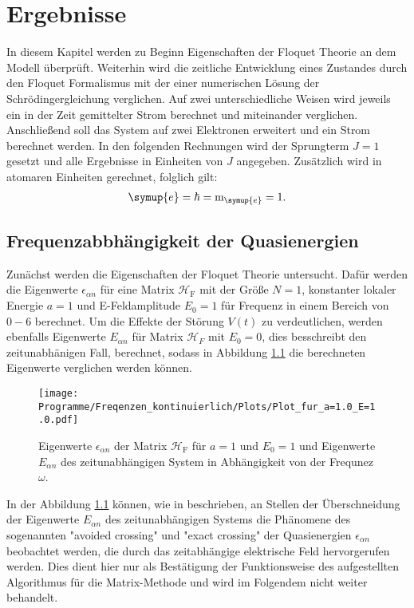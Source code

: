\chapter{Ergebnisse}
In diesem Kapitel werden zu Beginn
Eigenschaften der Floquet Theorie an dem Modell überprüft.
Weiterhin wird die zeitliche Entwicklung
eines Zustandes durch den
Floquet Formalismus mit der einer numerischen Lösung der
Schrödingergleichung verglichen.
Auf zwei unterschiedliche Weisen wird jeweils ein in der Zeit
gemittelter Strom berechnet und miteinander verglichen.
Anschließend soll das System auf zwei Elektronen erweitert und ein Strom berechnet werden.
In den folgenden Rechnungen wird der Sprungterm $J=1$
gesetzt und  alle Ergebnisse in Einheiten von $J$ angegeben.
Zusätzlich wird in atomaren Einheiten gerechnet, folglich gilt:
\begin{align}
   \symup{e}=\hbar=\text{m}_\symup{e}=1.
\end{align}
\section{Frequenzabbhängigkeit der Quasienergien}
Zunächst werden die Eigenschaften der Floquet Theorie
untersucht. Dafür
werden die Eigenwerte
 $\epsilon_{\alpha n}$ für eine
Matrix $\mathcal{H}_\mathrm{F}$ mit der
Größe $N=1$, konstanter lokaler Energie $a=1$ und E-Feldamplitude $E_0=1$
für Frequenz in einem Bereich von $0-6$  berechnet.
Um die Effekte der Störung $V(t)$ zu verdeutlichen,
werden ebenfalls Eigenwerte $E_{\alpha n}$ für Matrix $\mathcal{H}_F$ mit $E_0=0$, dies besschreibt den
zeitunabhänigen Fall, berechnet, sodass in Abbildung \ref{fig:epsilon_f}
die berechneten Eigenwerte verglichen werden können.

\begin{figure}
   \centering
   \texttt{[image: Programme/Freqenzen\_kontinuierlich/Plots/Plot\_fur\_a=1.0\_E=1.0.pdf]}
   \caption{Eigenwerte $\epsilon_{\alpha n}$ der Matrix $\mathcal{H}_\mathrm{F}$ für $a=1$ und $E_0=1$ und
   Eigenwerte $E_{\alpha n}$ des zeitunabhängigen System in Abhängigkeit von der Frequnez $\omega$.}
   \label{fig:epsilon_f}
\end{figure}
In der Abbildung \ref{fig:epsilon_f} können, wie in \cite{haenggi} beschrieben, an Stellen der Überschneidung der Eigenwerte  $E_{\alpha n}$
des zeitunabhängigen Systems die Phänomene des sogenannten "avoided crossing" und
"exact crossing" der Quasienergien $\epsilon_{\alpha n}$ beobachtet werden,
die durch das zeitabhängige elektrische Feld hervorgerufen werden.
Dies dient hier nur als Bestätigung der Funktionsweise
des aufgestellten Algorithmus für die Matrix-Methode und wird im Folgendem nicht weiter behandelt.


